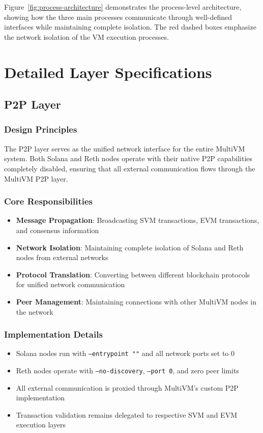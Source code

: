 \documentclass[11pt,a4paper]{article}
\begin{document}
Figure~\ref{fig:process-architecture} demonstrates the process-level architecture, showing how the three main processes communicate through well-defined interfaces while maintaining complete isolation. The red dashed boxes emphasize the network isolation of the VM execution processes.

\section{Detailed Layer Specifications}

\subsection{P2P Layer}

\subsubsection{Design Principles}
The P2P layer serves as the unified network interface for the entire MultiVM system. Both Solana and Reth nodes operate with their native P2P capabilities completely disabled, ensuring that all external communication flows through the MultiVM P2P layer.

\subsubsection{Core Responsibilities}
\begin{itemize}
    \item \textbf{Message Propagation}: Broadcasting SVM transactions, EVM transactions, and consensus information
    \item \textbf{Network Isolation}: Maintaining complete isolation of Solana and Reth nodes from external networks
    \item \textbf{Protocol Translation}: Converting between different blockchain protocols for unified network communication
    \item \textbf{Peer Management}: Maintaining connections with other MultiVM nodes in the network
\end{itemize}

\subsubsection{Implementation Details}
\begin{itemize}
    \item Solana nodes run with \texttt{--entrypoint ""} and all network ports set to 0
    \item Reth nodes operate with \texttt{--no-discovery}, \texttt{--port 0}, and zero peer limits
    \item All external communication is proxied through MultiVM's custom P2P implementation
    \item Transaction validation remains delegated to respective SVM and EVM execution layers
\end{itemize}
\end{document}
